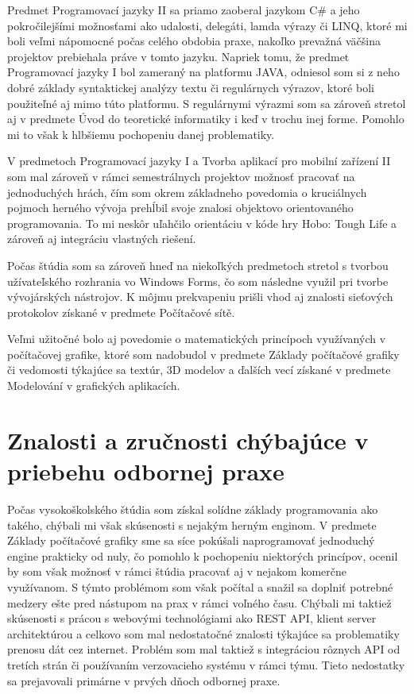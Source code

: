 \documentclass[slovak, bachelorpractice]{diploma}
\begin{document}
Predmet Programovací jazyky II sa priamo zaoberal jazykom C\# a jeho pokročilejšími možnosťami ako udalosti, delegáti, lamda výrazy či LINQ, ktoré mi boli veľmi nápomocné počas celého obdobia praxe, nakoľko prevažná väčšina projektov prebiehala práve v tomto jazyku. Napriek tomu, že predmet Programovací jazyky I bol zameraný na platformu JAVA, odniesol som si z neho dobré základy syntaktickej analýzy textu či regulárnych výrazov, ktoré boli použiteľné aj mimo túto platformu. S regulárnymi výrazmi som sa zároveň stretol aj v predmete Úvod do teoretické informatiky i keď v trochu inej forme. Pomohlo mi to však k hlbšiemu pochopeniu danej problematiky. 

V predmetoch Programovací jazyky I a Tvorba aplikací pro mobilní zařízení II som mal zároveň v rámci semestrálnych projektov možnosť pracovať na jednoduchých hrách, čím som okrem základneho povedomia o kruciálnych pojmoch herného vývoja prehĺbil svoje znalosi objektovo orientovaného programovania. To mi neskôr uľahčilo orientáciu v kóde hry Hobo: Tough Life a zároveň aj integráciu vlastných riešení.

Počas štúdia som sa zároveň hneď na niekoľkých predmetoch stretol s tvorbou užívateľského rozhrania vo Windows Forms, čo som následne využil pri tvorbe vývojárských nástrojov. K môjmu prekvapeniu prišli vhod aj znalosti sieťových protokolov získané v predmete Počítačové sítě.

Veľmi užitočné bolo aj povedomie o matematických princípoch využívaných v počítačovej grafike, ktoré som nadobudol v predmete Základy počítačové grafiky či vedomosti týkajúce sa textúr, 3D modelov a ďalších vecí získané v predmete Modelování v grafických aplikacích.

\label{sec:techZruc}
\section{Znalosti a zručnosti chýbajúce v priebehu odbornej praxe}
\label{sec:coNeviem}
Počas vysokoškolského štúdia som získal solídne základy programovania ako takého, chýbali mi však skúsenosti s nejakým herným enginom. V predmete Základy počítačové grafiky sme sa síce pokúšali naprogramovať jednoduchý engine prakticky od nuly, čo pomohlo k pochopeniu niektorých princípov, ocenil by som však možnosť v rámci štúdia pracovať aj v nejakom komerčne využívanom. S týmto problémom som však počítal a snažil sa doplniť potrebné medzery ešte pred nástupom na prax v rámci voľného času. Chýbali mi taktiež skúsenosti s prácou s webovými technológiami ako REST API, klient server architektúrou a celkovo som mal nedostatočné znalosti týkajúce sa problematiky prenosu dát cez internet. Problém som mal taktiež s integráciou rôznych API od tretích strán či používaním verzovacieho systému v rámci týmu. Tieto nedostatky sa prejavovali primárne v prvých dňoch odbornej praxe.
\end{document}
